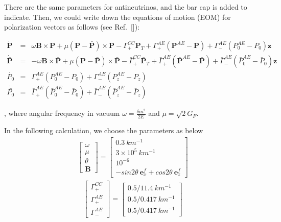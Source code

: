 \documentclass[aps,prd,twocolumn,amsmath,amssymb,groupedaddress]{revtex4-2}
\begin{document}
There are the same parameters for antineutrinos, and the bar cap is added to indicate. Then, we could write down the equations of motion (EOM) for polarization vectors as follows (see Ref.~[]):
\begin{widetext}
\begin{eqnarray} 
	\dot{\textbf{P}} &=& \omega \textbf{B} \times \textbf{P}+ \mu (\textbf{P}-\bar{\textbf{P}}) \times \textbf{P} - \Gamma^{CC}_+ \textbf{P}_T + \Gamma^{AE}_+ (\textbf{P}^{AE} - \textbf{P}) + \Gamma^{AE}_- (P^{AE}_0 -P_0)\textbf{z} \\
	\dot{\bar{\textbf{P}}} &=& -\omega \textbf{B} \times \bar{\textbf{P}}+ \mu (\textbf{P}-\bar{\textbf{P}}) \times \bar{\textbf{P}} - \bar{\Gamma}^{CC}_+ \bar{\textbf{P}}_T + \bar{\Gamma}^{AE}_+ (\bar{\textbf{P}}^{AE} - \bar{\textbf{P}}) + \bar{\Gamma}^{AE}_- (\bar{P}^{AE}_0 -\bar{P}_0)\textbf{z} \\
	\dot{P_0} &=& \Gamma^{AE}_+ (P^{AE}_0 -P_0) + \Gamma^{AE}_- (P^{AE}_z -P_z) \\
	\dot{\bar{P_0}} &=& \bar{\Gamma}^{AE}_+ (\bar{P}^{AE}_0 -\bar{P}_0) + \bar{\Gamma}^{AE}_- (\bar{P}^{AE}_z -\bar{P}_z)
\end{eqnarray}
\end{widetext}
, where angular frequency in vacuum $\omega = \frac{\delta m^2}{2E}$ and $\mu = \sqrt{2} G_F$.

In the following calculation, we choose the parameters as below
\begin{eqnarray}
	\begin{bmatrix}
		\omega \\ 
		\mu \\ 
		\theta\\
		\textbf{B}
	\end{bmatrix}
	= \begin{bmatrix}
		0.3 ~km^{-1} \\ 
		3 \times 10^5 ~km^{-1} \\ 
		10^{-6} \\
		-sin 2\theta~\textbf{e}_x^f + cos 2\theta~\textbf{e}_z^f 
	\end{bmatrix}
\end{eqnarray}
\begin{eqnarray}
	\begin{bmatrix}
		\Gamma^{CC}_+ \\ \Gamma^{AE}_+ \\ \Gamma^{AE}_-
	\end{bmatrix}
	= \begin{bmatrix}
		0.5/11.4 ~km^{-1} \\ 0.5/0.417 ~km^{-1} \\ 0.5/0.417 ~km^{-1}
	\end{bmatrix}
\end{eqnarray}
\end{document}
